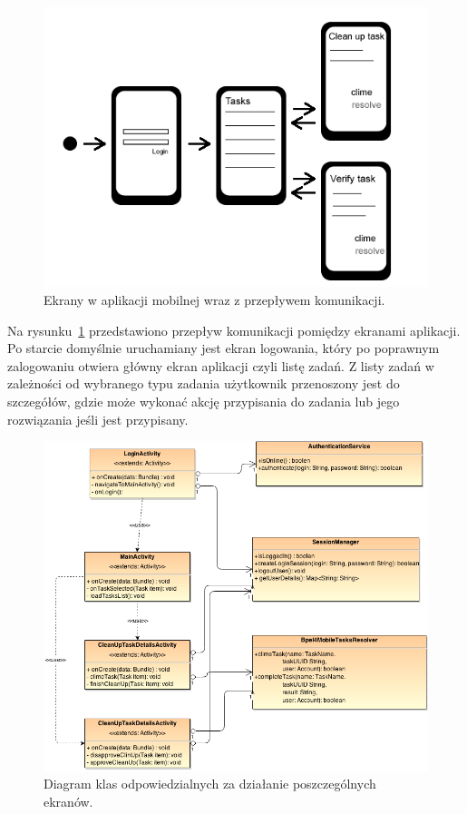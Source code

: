 \begin{figure}[h]
\centerline{\includegraphics[scale=0.7]{activityFlowDiagram}}
\caption{Ekrany w aplikacji mobilnej wraz z przepływem komunikacji.}
\label{fig:activityFlowDiagram}
\end{figure}

Na rysunku~\ref{fig:activityFlowDiagram} przedstawiono przepływ komunikacji pomiędzy ekranami aplikacji. Po starcie domyślnie uruchamiany jest ekran logowania, który po poprawnym zalogowaniu otwiera główny ekran aplikacji czyli listę zadań. Z listy zadań w zależności od wybranego typu zadania użytkownik przenoszony jest do szczegółów, gdzie może wykonać akcję przypisania do zadania lub jego rozwiązania jeśli jest przypisany. 

\begin{figure}[h]
\centerline{\includegraphics[scale=0.6]{activitiesClassDiagram}}
\caption{Diagram klas odpowiedzialnych za działanie poszczególnych ekranów.}
\label{fig:activitiesClassDiagram}
\end{figure}

